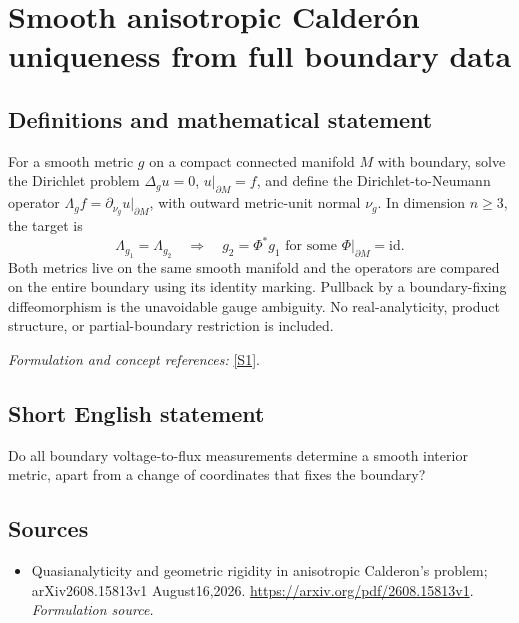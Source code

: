 \documentclass[11pt]{article}
\begin{document}
\section*{\texorpdfstring{Smooth anisotropic Calderón uniqueness from full boundary data}{Smooth anisotropic Calderón uniqueness from full boundary data}}\label{statement}
\subsection{Definitions and mathematical statement}
For a smooth metric $g$ on a compact connected manifold $M$ with boundary, solve the Dirichlet problem $\Delta_g u=0$, $u|_{\partial M}=f$, and define the Dirichlet-to-Neumann operator
$\Lambda_g f=\partial_{\nu_g}u|_{\partial M}$, with outward metric-unit normal $\nu_g$. In dimension $n\ge3$, the target is
\[
 \Lambda_{g_1}=\Lambda_{g_2}\quad\Longrightarrow\quad
 g_2=\Phi^*g_1\text{ for some }\Phi|_{\partial M}=\mathrm{id}.
\]
Both metrics live on the same smooth manifold and the operators are compared on the entire boundary using its identity marking. Pullback by a boundary-fixing diffeomorphism is the unavoidable gauge ambiguity. No real-analyticity, product structure, or partial-boundary restriction is included.
\par\smallskip\textit{Formulation and concept references:} \href{https://arxiv.org/pdf/2608.15813v1}{[S1]}.

\subsection{Short English statement}
Do all boundary voltage-to-flux measurements determine a smooth interior metric, apart from a change of coordinates that fixes the boundary?
\subsection{Sources}
\begin{itemize}
\item[S1]Quasianalyticity and geometric rigidity in anisotropic Calderon's problem; arXiv2608.15813v1 August16,2026.
\url{https://arxiv.org/pdf/2608.15813v1}.
\textit{Formulation source.}
\end{itemize}
\end{document}

